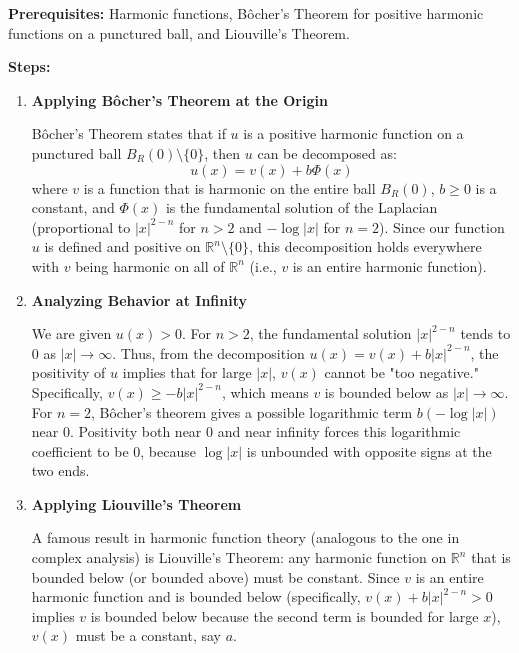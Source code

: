 \begin{solution}
\textbf{Prerequisites:} 
Harmonic functions, Bôcher's Theorem for positive harmonic functions on a punctured ball, and Liouville's Theorem.

\par\vspace{\baselineskip}
\textbf{Steps:}

\begin{enumerate}
    \item \textbf{Applying Bôcher's Theorem at the Origin}

    Bôcher's Theorem states that if $u$ is a positive harmonic function on a punctured ball $B_R(0) \setminus \{0\}$, then $u$ can be decomposed as:
    \[
    u(x) = v(x) + b \Phi(x)
    \]
    where $v$ is a function that is harmonic on the entire ball $B_R(0)$, $b \geq 0$ is a constant, and $\Phi(x)$ is the fundamental solution of the Laplacian (proportional to $|x|^{2-n}$ for $n > 2$ and $-\log|x|$ for $n=2$).
    Since our function $u$ is defined and positive on $\mathbb{R}^n \setminus \{0\}$, this decomposition holds everywhere with $v$ being harmonic on all of $\mathbb{R}^n$ (i.e., $v$ is an entire harmonic function).

    \item \textbf{Analyzing Behavior at Infinity}

    We are given $u(x) > 0$. For $n > 2$, the fundamental solution $|x|^{2-n}$ tends to 0 as $|x| \to \infty$. 
    Thus, from the decomposition $u(x) = v(x) + b|x|^{2-n}$, the positivity of $u$ implies that for large $|x|$, $v(x)$ cannot be "too negative." Specifically, $v(x) \geq -b|x|^{2-n}$, which means $v$ is bounded below as $|x| \to \infty$.
    For $n=2$, Bôcher's theorem gives a possible logarithmic term $b(-\log|x|)$ near $0$.  Positivity both near $0$ and near infinity forces this logarithmic coefficient to be $0$, because $\log|x|$ is unbounded with opposite signs at the two ends.

    \item \textbf{Applying Liouville's Theorem}

    A famous result in harmonic function theory (analogous to the one in complex analysis) is Liouville's Theorem: any harmonic function on $\mathbb{R}^n$ that is bounded below (or bounded above) must be constant.
    Since $v$ is an entire harmonic function and is bounded below (specifically, $v(x) + b|x|^{2-n} > 0$ implies $v$ is bounded below because the second term is bounded for large $x$), $v(x)$ must be a constant, say $a$.


\end{enumerate}
\end{solution}
